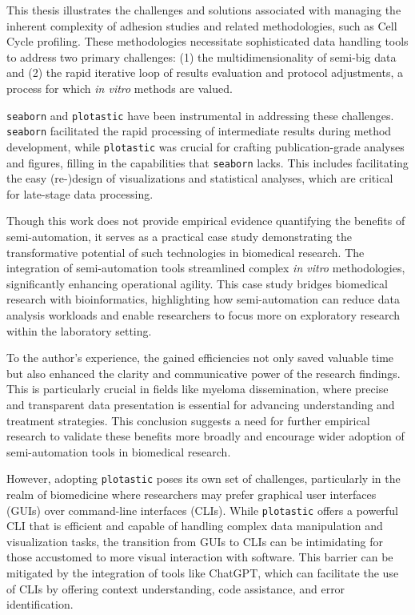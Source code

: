 %
\label{sec:discussion_conclusion_semi_automation}%
This thesis illustrates the challenges and solutions associated with managing
the inherent complexity of adhesion studies and related methodologies, such as
Cell Cycle profiling. These methodologies necessitate sophisticated data
handling tools to address two primary challenges: (1) the multidimensionality of
semi-big data and (2) the rapid iterative loop of results evaluation and protocol
adjustments, a process for which \textit{in vitro} methods are valued.

\texttt{seaborn} and \texttt{plotastic} have been instrumental in addressing
these challenges. \texttt{seaborn} facilitated the rapid processing of
intermediate results during method development, while \texttt{plotastic} was
crucial for crafting publication-grade analyses and figures, filling in the
capabilities that \texttt{seaborn} lacks. This includes facilitating the easy
(re-)design of visualizations and statistical analyses, which are critical for
late-stage data processing.

Though this work does not provide empirical evidence quantifying the benefits of
semi-automation, it serves as a practical case study demonstrating the
transformative potential of such technologies in biomedical research. The
integration of semi-automation tools streamlined complex \textit{in vitro}
methodologies, significantly enhancing operational agility. This case study
bridges biomedical research with bioinformatics, highlighting how
semi-automation can reduce data analysis workloads and enable researchers to
focus more on exploratory research within the laboratory setting.

To the author's experience, the gained efficiencies not only saved valuable time
but also enhanced the clarity and communicative power of the research findings.
This is particularly crucial in fields like myeloma dissemination, where precise
and transparent data presentation is essential for advancing understanding and
treatment strategies. This conclusion suggests a need for further empirical
research to validate these benefits more broadly and encourage wider adoption of
semi-automation tools in biomedical research.

However, adopting \texttt{plotastic} poses its own set of challenges,
particularly in the realm of biomedicine where researchers may prefer graphical
user interfaces (GUIs) over command-line interfaces (CLIs). While
\texttt{plotastic} offers a powerful CLI that is efficient and capable of
handling complex data manipulation and visualization tasks, the transition from
GUIs to CLIs can be intimidating for those accustomed to more visual interaction
with software. This barrier can be mitigated by the integration of tools like
ChatGPT, which can facilitate the use of CLIs by offering context understanding,
code assistance, and error identification.



